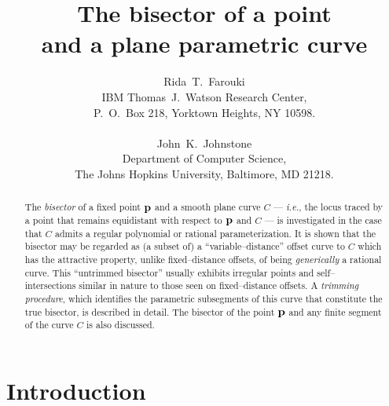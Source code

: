 \newcommand{\figg}[3]{\begin{figure}[htbp]\vspace{#3}\caption{#2}\label{#1}\end{figure}}

\title{
The bisector of a point \\
and a plane parametric curve
}

\author{
Rida~T.~Farouki \\
IBM Thomas~J.~Watson Research Center, \\
P.~O.~Box 218, Yorktown Heights, NY 10598. \\ \\
John~K.~Johnstone \\
Department of Computer Science, \\
The Johns Hopkins University, Baltimore, MD 21218.
}

\date{}

\maketitle
\thispagestyle{empty}

\begin{abstract}
The {\it bisector\/} of a fixed point ${\bf p}$ and a smooth
plane curve $C$ --- {\it i.e.}, the locus traced by a point
that remains equidistant with respect to ${\bf p}$ and $C$ ---
is investigated in the case that $C$ admits a regular polynomial
or rational parameterization. It is shown that the bisector may be
regarded as (a subset of) a ``variable--distance'' offset curve to
$C$ which has the attractive property, unlike fixed--distance offsets,
of being {\it generically\/} a rational curve. This ``untrimmed
bisector'' usually exhibits irregular points and self--intersections
similar in nature to those seen on fixed--distance offsets. A {\it
trimming procedure}, which identifies the parametric subsegments
of this curve that constitute the true bisector, is described in
detail. The bisector of the point ${\bf p}$ and any finite segment
of the curve $C$ is also discussed.
\end{abstract}

\newpage\thispagestyle{empty}\mbox{}\vfill\eject
{}
\setcounter{page}{1}
\thispagestyle{plain}

\section{Introduction}
\label{intro}

